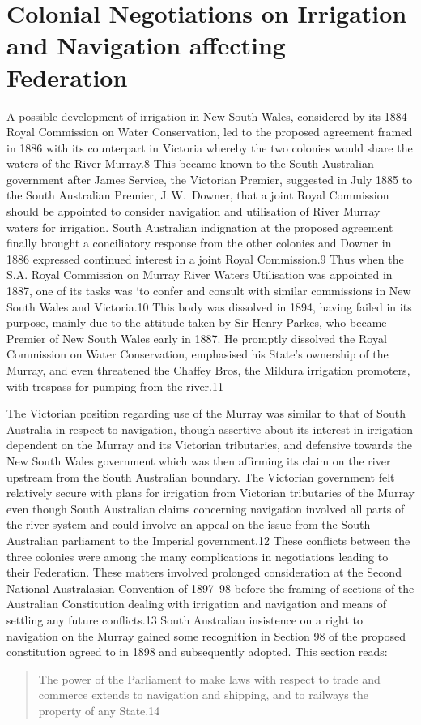 \section{Colonial Negotiations on Irrigation and Navigation
affecting Federation}

A possible development of irrigation in New South Wales, considered by
its 1884 Royal Commission on Water Conservation, led to the proposed
agreement framed in 1886 with its counterpart in Victoria whereby the
two colonies would share the waters of the River Murray.8 This became
known to the South Australian government after James Service, the
Victorian Premier, suggested in July 1885 to the South Australian
Premier, J.\,W.~Downer, that a joint Royal Commission should be
appointed to consider navigation and utilisation of River Murray
waters for irrigation.  South Australian indignation at the proposed
agreement finally brought a conciliatory response from the other
colonies and Downer in 1886 expressed continued interest in a joint
Royal Commission.9 Thus when the S.A. Royal Commission on Murray River
Waters Utilisation was appointed in 1887, one of its tasks was `to
confer and consult with similar commissions in New South Wales and
Victoria.10 This body was dissolved in 1894, having failed in its
purpose, mainly due to the attitude taken by Sir Henry Parkes, who
became Premier of New South Wales early in 1887.  He promptly
dissolved the Royal Commission on Water Conservation, emphasised his
State's ownership of the Murray, and even threatened the Chaffey Bros,
the Mildura irrigation promoters, with trespass for pumping from the
river.11

The Victorian position regarding use of the Murray was similar to that
of South Australia in respect to navigation, though assertive about
its interest in irrigation dependent on the Murray and its Victorian
tributaries, and defensive towards the New South Wales government
which was then affirming its claim on the river upstream from the
South Australian boundary.  The Victorian government felt relatively
secure with plans for irrigation from Victorian tributaries of the
Murray even though South Australian claims concerning navigation
involved all parts of the river system and could involve an appeal on
the issue from the South Australian parliament to the Imperial
government.12 These conflicts between the three colonies were among
the many complications in negotiations leading to their Federation.
These matters involved prolonged consideration at the Second National
Australasian Convention of 1897--98 before the framing of sections of
the Australian Constitution dealing with irrigation and navigation and
means of settling any future conflicts.13 South Australian insistence
on a right to navigation on the Murray gained some recognition in
Section 98 of the proposed constitution agreed to in 1898 and
subsequently adopted. This section reads:
\begin{quote}
	The power of the Parliament to make laws with respect to trade
	and commerce extends to navigation and shipping, and to
	railways the property of any State.14
\end{quote}

